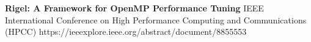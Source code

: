 
\vspace*{0.2cm}
\begin{scholarship}
					{\textbf{Rigel: A Framework for OpenMP Performance Tuning} 
                    IEEE International Conference on High Performance Computing and Communications (HPCC)
                    https://ieeexplore.ieee.org/abstract/document/8855553}
\end{scholarship}